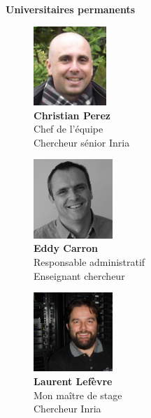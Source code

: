 \textbf{Universitaires permanents}
\begin{figure}[h!]
   \begin{minipage}{0.33\textwidth}
		\centering
		\includegraphics[height=3cm]{partie1/images/christian.jpg}\\
		\textbf{Christian Perez}\\
		Chef de l'équipe\\Chercheur sénior Inria
	\end{minipage}\hfill
	\begin{minipage}{0.33\textwidth}
		\centering
		\includegraphics[width=3cm]{partie1/images/eddy.jpeg}\\
		\textbf{Eddy Carron}\\
		Responsable administratif\\Enseignant chercheur
	\end{minipage}\hfill
	\begin{minipage}{0.33\textwidth}
		\centering
		\includegraphics[width=3cm]{partie1/images/laurent.jpg}\\
		\textbf{Laurent Lefèvre}\\
		Mon maître de stage\\Chercheur Inria
	\end{minipage}
\end{figure}

